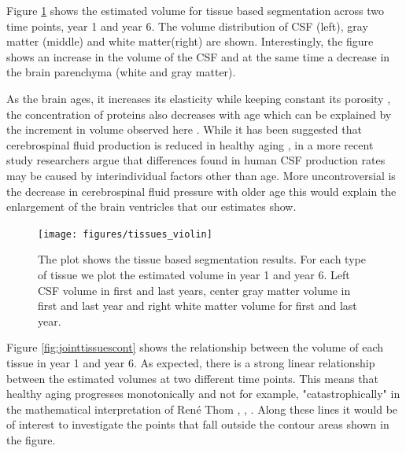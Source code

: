\documentclass[11pt]{article}
\theoremstyle{definition}
\theoremstyle{remark}
\begin{document}
Figure \ref{fig:violtissues} shows the estimated volume for tissue based segmentation across two time points, year 1 and year 6. The volume distribution of CSF (left), gray matter (middle) and white matter(right) are shown. Interestingly, the figure shows an increase in the volume of the CSF and at the same time a decrease in the brain parenchyma (white and gray matter). 

As the brain ages, it increases its elasticity while keeping constant its porosity \cite{lasheras2007biomechanics}, the concentration of proteins also decreases with age which can be explained by the increment in volume observed here \cite{chen2012influence}. While it has been suggested that cerebrospinal fluid production is reduced in healthy aging \cite{may1990cerebrospinal}, in a more recent study \cite{gideon1994cerebrospinal} researchers argue that differences found in human CSF production rates may be caused by interindividual factors other than age. 
More uncontroversial is the decrease in cerebrospinal fluid pressure with older age \cite{fleischman2012cerebrospinal} this would explain the enlargement of the brain ventricles that our estimates show.

\begin{figure}[!htb]
        \centering
        \texttt{[image: figures/tissues\_violin]}
        \caption{The plot shows the tissue based segmentation results. For each type of tissue we plot the estimated volume in year 1 and year 6. Left CSF volume in first and last years, center gray matter volume in first and last year and right white matter volume for first and last year. } 
        \label{fig:violtissues}
\end{figure}

Figure \ref{fig:jointtissuescont} shows the relationship between the volume of each tissue in year 1 and year 6. As expected, there is a strong linear relationship between the estimated volumes at two different time points. This means that healthy aging progresses monotonically and not for example, "catastrophically" in the mathematical interpretation of René Thom \cite{rosen1979catastrophe}, \cite{zeeman1979catastrophe}, \cite{thom2018structural}. Along these lines it would be of interest to investigate the points that fall outside the contour areas shown in the figure.
\end{document}
